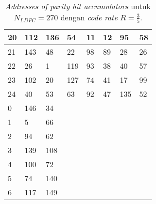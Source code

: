 \begin{table}[tb]
	\centering
	\caption{\textit{Addresses of parity bit accumulators} untuk $N_{LDPC}=270$ dengan \textit{code rate} $R=\frac{3}{5}$.}
	\label{table:rate2}
\begin{tabular}{|l|l|l|lllll}
	\hline
	20 & 112 & 136 & \multicolumn{1}{l|}{54}  & \multicolumn{1}{l|}{11} & \multicolumn{1}{l|}{12} & \multicolumn{1}{l|}{95}  & \multicolumn{1}{l|}{58} \\ \hline
	21 & 143 & 48  & \multicolumn{1}{l|}{22}  & \multicolumn{1}{l|}{98} & \multicolumn{1}{l|}{89} & \multicolumn{1}{l|}{28}  & \multicolumn{1}{l|}{26} \\ \hline
	22 & 26  & 1   & \multicolumn{1}{l|}{119} & \multicolumn{1}{l|}{93} & \multicolumn{1}{l|}{38} & \multicolumn{1}{l|}{40}  & \multicolumn{1}{l|}{57} \\ \hline
	23 & 102 & 20  & \multicolumn{1}{l|}{127} & \multicolumn{1}{l|}{74} & \multicolumn{1}{l|}{41} & \multicolumn{1}{l|}{17}  & \multicolumn{1}{l|}{99} \\ \hline
	24 & 40  & 53  & \multicolumn{1}{l|}{63}  & \multicolumn{1}{l|}{92} & \multicolumn{1}{l|}{47} & \multicolumn{1}{l|}{135} & \multicolumn{1}{l|}{52} \\ \hline
	0  & 146 & 34  &                          &                         &                         &                          &                         \\ \cline{1-3}
	1  & 5   & 66  &                          &                         &                         &                          &                         \\ \cline{1-3}
	2  & 94  & 62  &                          &                         &                         &                          &                         \\ \cline{1-3}
	3  & 139 & 108 &                          &                         &                         &                          &                         \\ \cline{1-3}
	4  & 100 & 72  &                          &                         &                         &                          &                         \\ \cline{1-3}
	5  & 74  & 140 &                          &                         &                         &                          &                         \\ \cline{1-3}
	6  & 117 & 149 &                          &                         &                         &                          &                         \\ \cline{1-3}

\end{tabular}
\end{table}
